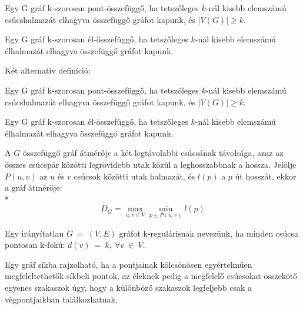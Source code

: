   \begin{definition} 
    Egy G gráf k-szorosan pont-összefüggő, ha tetszőleges $k$-nál kisebb elemszámú csúcshalmazát elhagyva összefüggő gráfot kapunk, és $|V(G)| \geq k$.
  \end{definition}
  \begin{definition} 
    Egy G gráf k-szorosan él-összefüggő, ha tetszőleges $k$-nál kisebb elemszámú élhalmazát elhagyva összefüggő gráfot kapunk.
  \end{definition}

  Két alternatív definíció:
  \begin{definition} 
    Egy G gráf k-szorosan pont-összefüggő, ha tetszőleges $k$-nál kisebb elemszámú csúcshalmazát elhagyva összefüggő gráfot kapunk, és $|V(G)| \geq k$.
  \end{definition}

  \begin{definition} 
    Egy G gráf k-szorosan él-összefüggő, ha tetszőleges $k$-nál kisebb elemszámú élhalmazát elhagyva összefüggő gráfot kapunk.
  \end{definition}

  \begin{definition} 
    A $G$ összefüggő gráf átmérője a két legtávolabbi csúcsának távolsága, azaz az összes csúcspár közötti legrövidebb utak közül a leghosszabbnak a hossza. Jelölje $P(u, v)$ az $u$ és $v$ csúcsok közötti utak halmazát, és $l(p)$ a $p$ út hosszát, ekkor a gráf átmérője:\\*
    $$D_G = \max_{u,v \in V} \min_{p \in P(u,v)} l(p)$$
  \end{definition}

  \begin{definition} 
    Egy irányítatlan $G~=~(V,E)$ gráfot k-regulárisnak nevezünk, ha minden csúcsa pontosan k-fokú:
    $d(v)~=~k,~\forall v~\in~V.$
  \end{definition}

  \begin{definition} 
    Egy gráf síkba rajzolható, ha a pontjainak kölcsönösen egyértelműen megfeleltethetők síkbeli pontok, az éleknek pedig a megfelelő csúcsokat összekötő egyenes szakaszok úgy, hogy a különböző szakaszok legfeljebb csak a végpontjaikban találkozhatnak.
  \end{definition}

